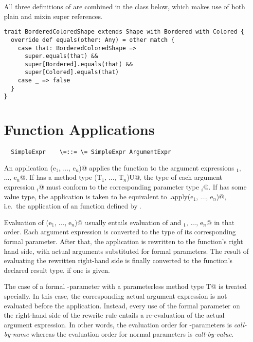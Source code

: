 \documentclass[11pt]{report}
\begin{document}
All three definitions of \verb@equals@ are combined in the class
below, which makes use of both plain and mixin super references.
\begin{verbatim}
trait BorderedColoredShape extends Shape with Bordered with Colored {
  override def equals(other: Any) = other match {
    case that: BorderedColoredShape => 
      super.equals(that) && 
      super[Bordered].equals(that) &&
      super[Colored].equals(that)
    case _ => false
  }
}
\end{verbatim}

\section{Function Applications}
\label{sec:apply}

\syntax\begin{verbatim}
  SimpleExpr    \=::= \= SimpleExpr ArgumentExpr
\end{verbatim}

An application \verb@f(e$_1$, ..., e$_n$)@ applies the function \verb@f@ to the
argument expressions \verb@e$_1$, ..., e$_n$@. If \verb@f@ has a method type
\verb@(T$_1$, ..., T$_n$)U@, the type of each argument
expression \verb@e$_i$@ must conform to the corresponding parameter type
\verb@T$_i$@. If \verb@f@ has some value type, the application is taken to be
equivalent to \verb@f.apply(e$_1$, ..., e$_n$)@, i.e.\ the
application of an \verb@apply@ function defined by \verb@f@.


Evaluation of \verb@f(e$_1$, ..., e$_n$)@ usually entails evaluation of
\verb@f@ and \verb@e$_1$, ..., e$_n$@ in that order. Each argument expression
is converted to the type of its corresponding formal parameter.  After
that, the application is rewritten to the function's right hand side,
with actual arguments substituted for formal parameters.  The result
of evaluating the rewritten right-hand side is finally converted to
the function's declared result type, if one is given.

The case of a formal \verb@def@-parameter with a parameterless
method type \verb@[]T@ is treated specially. In this case, the
corresponding actual argument expression is not evaluated before the
application. Instead, every use of the formal parameter on the
right-hand side of the rewrite rule entails a re-evaluation of the
actual argument expression. In other words, the evaluation order for
\verb@def@-parameters is {\em call-by-name} whereas the evaluation
order for normal parameters is {\em call-by-value}.
\end{document}
